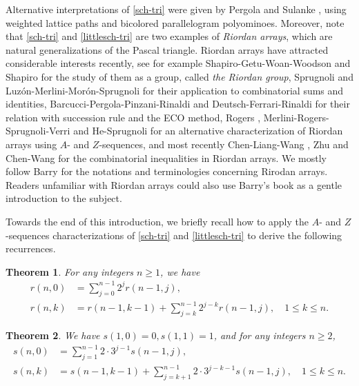 \documentclass[11pt,reqno]{amsart}
\numberwithin{equation}{section}
\theoremstyle{plain}
\newtheorem{theorem}{Theorem}[section]
\theoremstyle{definition}
\begin{document}
Alternative interpretations of \eqref{sch-tri} were given by Pergola and Sulanke \cite{PS}, using weighted lattice paths and bicolored parallelogram polyominoes. Moreover, note that \eqref{sch-tri} and \eqref{littlesch-tri} are two examples of \emph{Riordan arrays}, which are natural generalizations of the Pascal triangle. Riordan arrays have attracted considerable interests recently, see for example Shapiro-Getu-Woan-Woodson \cite{SGWW} and Shapiro \cite{Sha} for the study of them as a group, called \emph{the Riordan group}, Sprugnoli \cite{Spr} and Luz\'on-Merlini-Mor\'on-Sprugnoli \cite{LMMS} for their application to combinatorial sums and identities, Barcucci-Pergola-Pinzani-Rinaldi \cite{BPPR} and Deutsch-Ferrari-Rinaldi \cite{DFR} for their relation with succession rule and the ECO method, Rogers \cite{Rog}, Merlini-Rogers-Sprugnoli-Verri \cite{MRSV} and He-Sprugnoli \cite{HS} for an alternative characterization of Riordan arrays using $A$- and $Z$-sequences, and most recently Chen-Liang-Wang \cite{CLW}, Zhu \cite{Zhu} and Chen-Wang \cite{CW} for the combinatorial inequalities in Riordan arrays. We mostly follow Barry \cite{Bar} for the notations and terminologies concerning Rirodan arrays. Readers unfamiliar with Riordan arrays could also use Barry's book as a gentle introduction to the subject.  

Towards the end of this introduction, we briefly recall how to apply the $A$- and $Z$-sequences characterizations of \eqref{sch-tri} and \eqref{littlesch-tri} to derive the following recurrences.

\begin{theorem}\label{thm:Sch}
For any integers $n\ge 1$, we have
\begin{align}
r(n,0)&=\sum\limits_{j=0}^{n-1}2^{j}r(n-1,j),\label{sch-Z}\\
r(n,k)&=r(n-1,k-1)+\sum\limits_{j=k}^{n-1}2^{j-k}r(n-1,j),\quad 1\le k\le n. \label{sch-A}
\end{align}
\end{theorem}


\begin{theorem}\label{thm:litSch}
We have $s(1,0)=0, s(1,1)=1$, and for any integers $n\ge 2$,
\begin{align}
s(n,0) &=\sum\limits_{j=1}^{n-1}2\cdot3^{j-1}s(n-1,j),\label{litsch-Z}\\
s(n,k) &=s(n-1,k-1)+\sum\limits_{j=k+1}^{n-1}2\cdot3^{j-k-1}s(n-1,j),\quad 1\le k\le n. \label{litsch-A}
\end{align}
\end{theorem}
\end{document}
